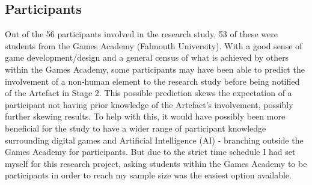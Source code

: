 \subsection{Participants}
Out of the 56 participants involved in the research study, 53 of these were students from the Games Academy (Falmouth University). With a good sense of game development/design and a general census of what is achieved by others within the Games Academy, some participants may have been able to predict the involvement of a non-human element to the research study before being notified of the Artefact in Stage 2. This possible prediction skews the expectation of a participant not having prior knowledge of the Artefact's involvement, possibly further skewing results.
To help with this, it would have possibly been more beneficial for the study to have a wider range of participant knowledge surrounding digital games and Artificial Intelligence (AI) - branching outside the Games Academy for participants. But due to the strict time schedule I had set myself for this research project, asking students within the Games Academy to be participants in order to reach my sample size was the easiest option available.